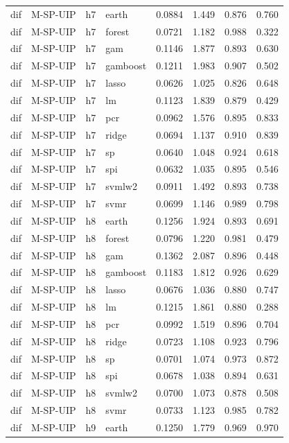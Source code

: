 \begin{ThreePartTable}
\begin{longtable}[t]{llclcccc}
\addlinespace
dif & M-SP-UIP & h7 & earth & 0.0884 & 1.449 & 0.876 & 0.760\\
dif & M-SP-UIP & h7 & forest & 0.0721 & 1.182 & 0.988 & 0.322\\
dif & M-SP-UIP & h7 & gam & 0.1146 & 1.877 & 0.893 & 0.630\\
dif & M-SP-UIP & h7 & gamboost & 0.1211 & 1.983 & 0.907 & 0.502\\
dif & M-SP-UIP & h7 & lasso & 0.0626 & 1.025 & 0.826 & 0.648\\
dif & M-SP-UIP & h7 & lm & 0.1123 & 1.839 & 0.879 & 0.429\\
dif & M-SP-UIP & h7 & pcr & 0.0962 & 1.576 & 0.895 & 0.833\\
dif & M-SP-UIP & h7 & ridge & 0.0694 & 1.137 & 0.910 & 0.839\\
dif & M-SP-UIP & h7 & sp & 0.0640 & 1.048 & 0.924 & 0.618\\
dif & M-SP-UIP & h7 & spi & 0.0632 & 1.035 & 0.895 & 0.546\\
dif & M-SP-UIP & h7 & svmlw2 & 0.0911 & 1.492 & 0.893 & 0.738\\
dif & M-SP-UIP & h7 & svmr & 0.0699 & 1.146 & 0.989 & 0.798\\
\addlinespace
dif & M-SP-UIP & h8 & earth & 0.1256 & 1.924 & 0.893 & 0.691\\
dif & M-SP-UIP & h8 & forest & 0.0796 & 1.220 & 0.981 & 0.479\\
dif & M-SP-UIP & h8 & gam & 0.1362 & 2.087 & 0.896 & 0.448\\
dif & M-SP-UIP & h8 & gamboost & 0.1183 & 1.812 & 0.926 & 0.629\\
dif & M-SP-UIP & h8 & lasso & 0.0676 & 1.036 & 0.880 & 0.747\\
dif & M-SP-UIP & h8 & lm & 0.1215 & 1.861 & 0.880 & 0.288\\
dif & M-SP-UIP & h8 & pcr & 0.0992 & 1.519 & 0.896 & 0.704\\
dif & M-SP-UIP & h8 & ridge & 0.0723 & 1.108 & 0.923 & 0.796\\
dif & M-SP-UIP & h8 & sp & 0.0701 & 1.074 & 0.973 & 0.872\\
dif & M-SP-UIP & h8 & spi & 0.0678 & 1.038 & 0.894 & 0.631\\
dif & M-SP-UIP & h8 & svmlw2 & 0.0700 & 1.073 & 0.878 & 0.508\\
dif & M-SP-UIP & h8 & svmr & 0.0733 & 1.123 & 0.985 & 0.782\\
\addlinespace
dif & M-SP-UIP & h9 & earth & 0.1250 & 1.779 & 0.969 & 0.970\\

\end{longtable}
\end{ThreePartTable}

